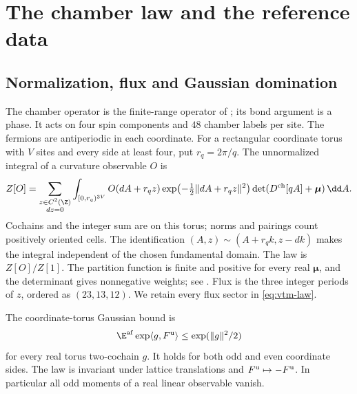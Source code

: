 \section{The chamber law and the reference data}\label{sec:vtm-data}

\subsection{Normalization, flux and Gaussian domination}

The chamber operator is the finite-range operator of
\cite[\S2]{ChamberLattice}; its bond argument is a phase.
It acts on four spin components and $48$ chamber labels per
site. The fermions are antiperiodic in each coordinate.
For a rectangular coordinate torus with $V$ sites and every
side at least four, put $r_q=2\pi/q$. The unnormalized integral
of a curvature observable $O$ is
\begin{equation}\label{eq:vtm-law}
 Z[O]=\sum_{\substack{z\in C^2(\Z)\\dz=0}}
  \int_{[0,r_q)^{3V}}
 O(dA+r_qz)\exp\bigl(-\tfrac12\|dA+r_qz\|^2\bigr)
 \det(D^{\rm ch}[qA]+\boldsymbol\mu)\,\dd A.
\end{equation}
Cochains and the integer sum are on this torus; norms and
pairings count positively oriented cells. The identification
$(A,z)\sim(A+r_qk,z-dk)$ makes the integral independent
of the chosen fundamental domain. The law is $Z[O]/Z[1]$.
The partition function is finite and positive for every real
$\boldsymbol\mu$, and the determinant gives nonnegative weights;
see \cite[\S2--3]{ChamberLattice}. Flux is the three integer
periods of $z$, ordered as $(23,13,12)$.
We retain every flux sector in \eqref{eq:vtm-law}.

The coordinate-torus Gaussian bound
\cite[Proposition~5.1]{ChamberLattice} is
\begin{equation}\label{eq:slab-gaussian-domination}
 \E^{\rm af}\exp\langle g,F^{\rm u}\rangle
       \le\exp(\|g\|^2/2)
\end{equation}
for every real torus two-cochain $g$.
It holds for both odd and even coordinate sides.
The law is invariant under lattice translations and
$F^{\rm u}\mapsto-F^{\rm u}$. In particular all odd
moments of a real linear observable vanish.

